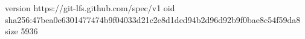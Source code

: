 version https://git-lfs.github.com/spec/v1
oid sha256:47bea0e6301477474b9f04033d21c2e8d1ded94b2d96d92b9f0bae8c54f59da8
size 5936
